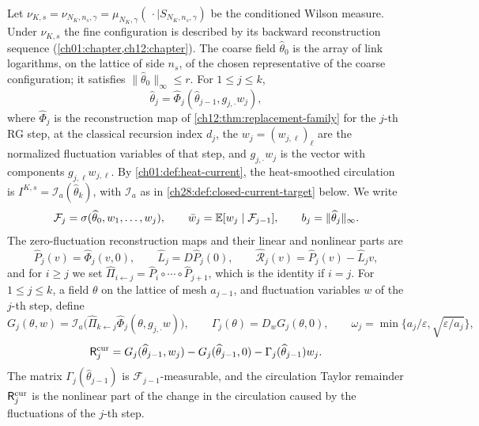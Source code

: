 Let $\nu_{K,s}=\nu_{N_K,n_s,\gamma}=\mu_{N_K,\gamma}(\,\cdot\mid S_{N_K,n_s,\gamma})$ be the conditioned Wilson measure. Under $\nu_{K,s}$ the fine configuration is described by its backward reconstruction sequence (\cref{ch01:chapter,ch12:chapter}). The coarse field $\widehat\theta_0$ is the array of link logarithms, on the lattice of side $n_s$, of the chosen representative of the coarse configuration; it satisfies $\|\widehat\theta_0\|_\infty\le r$. For $1\le j\le k$,
\[
 \widehat\theta_j=\widehat\Phi_j(\widehat\theta_{j-1},g_{j,\cdot}w_j),
\]
where $\widehat\Phi_j$ is the reconstruction map of \cref{ch12:thm:replacement-family} for the $j$-th RG step, at the classical recursion index $d_j$, the $w_j=(w_{j,\ell})_\ell$ are the normalized fluctuation variables of that step, and $g_{j,\cdot}w_j$ is the vector with components $g_{j,\ell}w_{j,\ell}$. By \cref{ch01:def:heat-current}, the heat-smoothed circulation is $I^{K,s}=\mathcal I_a(\widehat\theta_k)$, with $\mathcal I_a$ as in \cref{ch28:def:closed-current-target} below. We write
\[
 \mathcal F_j=\sigma(\widehat\theta_0,w_1,\dots,w_j),\qquad \bar w_j=\mathbb E[w_j\mid\mathcal F_{j-1}],\qquad b_j=\|\widehat\theta_j\|_\infty.
\]
The zero-fluctuation reconstruction maps and their linear and nonlinear parts are
\[
 \widehat P_j(v)=\widehat\Phi_j(v,0),\qquad \widehat L_j=D\widehat P_j(0),\qquad \widehat{\mathcal R}_j(v)=\widehat P_j(v)-\widehat L_jv,
\]
and for $i\ge j$ we set $\widehat\Pi_{i\leftarrow j}=\widehat P_i\circ\cdots\circ\widehat P_{j+1}$, which is the identity if $i=j$. For $1\le j\le k$, a field $\theta$ on the lattice of mesh $a_{j-1}$, and fluctuation variables $w$ of the $j$-th step, define
\[
 G_j(\theta,w)=\mathcal I_a\bigl(\widehat\Pi_{k\leftarrow j}\widehat\Phi_j(\theta,g_{j,\cdot}w)\bigr),\qquad \Gamma_j(\theta)=D_wG_j(\theta,0),\qquad \omega_j=\min\{a_j/\varepsilon,\sqrt{\varepsilon/a_j}\},
\]
\[
 \mathsf R_j^{\rm cur}=G_j(\widehat\theta_{j-1},w_j)-G_j(\widehat\theta_{j-1},0)-\Gamma_j(\widehat\theta_{j-1})w_j.
\]
The matrix $\Gamma_j(\widehat\theta_{j-1})$ is $\mathcal F_{j-1}$-measurable, and the circulation Taylor remainder $\mathsf R_j^{\rm cur}$ is the nonlinear part of the change in the circulation caused by the fluctuations of the $j$-th step.

